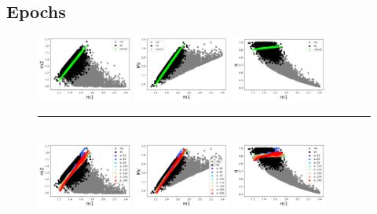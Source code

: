 \documentclass[prd,aps,twocolumn,a4paper,showkeys,nofootinbib]{revtex4-1}
\begin{document}
\subsection{Epochs}
\label{sec:epochs}
\begin{figure}[]
  \center
  \includegraphics[width=0.28\textwidth]{./Figs/grey_m1m2.png}
  \includegraphics[width=0.28\textwidth]{./Figs/grey_m1Mc.png}
  \includegraphics[width=0.28\textwidth]{./Figs/grey_m1q.png} \\
  \rule[1ex]{14cm}{0.5pt}\\
  \includegraphics[width=0.28\textwidth]{./Figs/muMc_rainbow_m1m2.png}
  \includegraphics[width=0.28\textwidth]{./Figs/muMc_rainbow_m1Mc.png}
  \includegraphics[width=0.28\textwidth]{./Figs/muMc_rainbow_m1q.png} \\

\end{figure}
\end{document}

